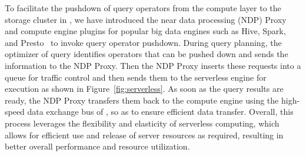 To facilitate the pushdown of query operators from the compute layer to the storage cluster in \sys, we have introduced the near data processing (NDP) Proxy and compute engine plugins for popular big data engines such as Hive, Spark, and Presto~\cite{hive, spark,presto} to invoke query operator  pushdown. 
 During query planning, the optimizer of  query  identifies operators that can be pushed down and sends the information to the NDP Proxy.  Then the NDP Proxy inserts these requests into a queue for traffic control and then sends them to the serverless engine for execution as shown in Figure~\ref{fig:serverless}.
As soon as the query results are ready, the NDP Proxy transfers them back to the compute engine using the high-speed data exchange bus of \sys, so as to ensure efficient data transfer.
Overall,  this process leverages the flexibility and elasticity of serverless computing, which allows for efficient use and release of server resources as required, resulting in better overall performance and resource utilization. 
























